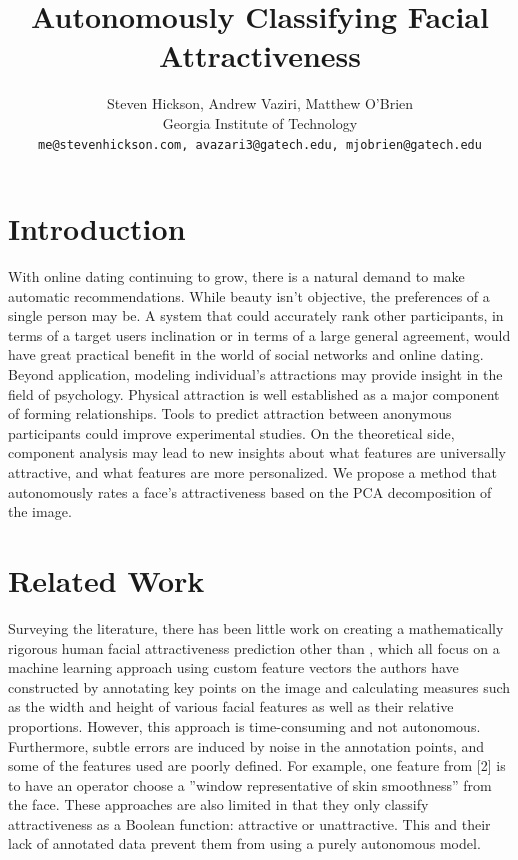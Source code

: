 \documentclass[10pt,twocolumn,letterpaper]{article}
\begin{document}
\title{Autonomously Classifying Facial Attractiveness}

\author{Steven Hickson, Andrew Vaziri, Matthew O'Brien \\
Georgia Institute of Technology\\
{\tt\small me@stevenhickson.com, avazari3@gatech.edu, mjobrien@gatech.edu}
}

\maketitle


\section{Introduction}
With online dating continuing to grow, there is a natural
demand to make automatic recommendations. While
beauty isn’t objective, the preferences of a single person
may be. A system that could accurately rank other participants,
in terms of a target users inclination or in terms of a large general agreement, would have
great practical benefit in the world of social networks and online dating.
Beyond application, modeling individual’s attractions
may provide insight in the field of psychology. Physical
attraction is well established as a major component of forming
relationships. Tools to predict attraction between anonymous
participants could improve experimental studies. On
the theoretical side, component analysis may lead to new
insights about what features are universally attractive, and
what features are more personalized. We propose a method that 
autonomously rates a face's attractiveness based on the PCA decomposition of the image.
 
\section{Related Work}
Surveying the literature, there has been little work on
creating a mathematically rigorous human facial attractiveness
prediction other than \cite{eisenthal2006facial, kagian2006humanlike, kagian2008machine}, which all focus on a
machine learning approach using custom feature vectors
the authors have constructed by annotating key points on
the image and calculating measures such as the width and
height of various facial features as well as their relative proportions.
However, this approach is time-consuming and
not autonomous. Furthermore, subtle errors are induced by
noise in the annotation points, and some of the features used
are poorly defined. For example, one feature from [2] is to
have an operator choose a ”window representative of skin
smoothness” from the face. These approaches are also limited
in that they only classify attractiveness as a Boolean
function: attractive or unattractive. This and their 
lack of annotated data prevent them from using a purely autonomous model.
\end{document}
